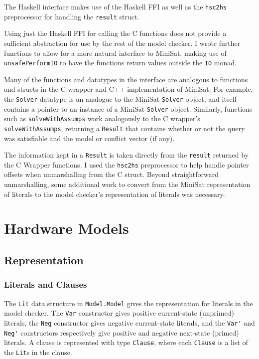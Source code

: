 \documentclass[12pt,a4paper,twoside,openright]{report}
\begin{document}
{The Haskell interface makes use of the Haskell FFI as well as the \verb,hsc2hs, preprocessor
for handling the \verb,result, struct.

Using just the Haskell FFI for calling the C functions does not provide a
sufficient abstraction for use by the rest of the model checker.
I wrote further functions to allow for a more natural interface to MiniSat,
 making use of \verb,unsafePerformIO, to have the functions return
values outside the \verb,IO, monad.

Many of the functions and datatypes in the interface are analogous to functions and structs in
the C wrapper and C++ implementation of MiniSat. For example, the \verb,Solver, datatype is an
analogue to the MiniSat \verb,Solver, object, and itself contains a pointer to an instance of
a MiniSat \verb,Solver, object. Similarly, functions such as \verb,solveWithAssumps, work
analogously to the C wrapper's \verb,solveWithAssumps,, returning a \verb,Result, that contains
whether or not the query was satisfiable and the model or conflict vector (if any).

The information kept in a \verb,Result, is taken directly from the \verb,result, returned by
the C Wrapper functions. I used the \verb,hsc2hs, preprocessor to help handle pointer offsets
when unmarshalling from the C struct. Beyond straightforward unmarshalling, some additional work
to convert from the MiniSat representation of literals to the model checker’s representation of
literals was necessary.

\section{Hardware Models}
\subsection{Representation}
\subsubsection{Literals and Clauses}
The \verb,Lit, data structure in \verb,Model.Model, gives the representation for literals in
the model checker.
The \verb,Var, constructor gives positive current-state (unprimed) literals, the \verb,Neg,
constructor gives negative current-state literals, and the \verb,Var', and \verb,Neg', constructors
respectively give positive and negative next-state (primed) literals.
A clause is represented with type \verb,Clause,, where each \verb,Clause, is a
list of the \verb,Lit,s in the clause.

}
\end{document}
